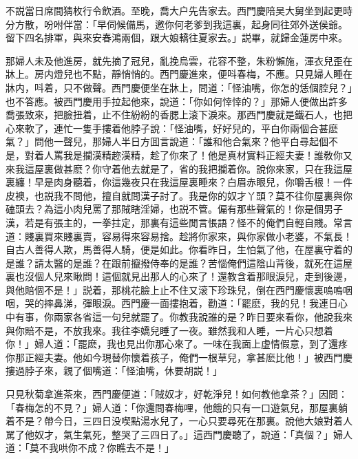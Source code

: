 不説當日席間猜枚行令飲酒。至晚，喬大户先告家去。西門慶陪吴大舅坐到起更時分方散，吩咐伴當：「早伺候備馬，邀你何老爹到我這裏，起身同往郊外送侯爺。留下四名排軍，與來安春鴻兩個，跟大娘轎往夏家去。」説畢，就歸金蓮房中來。

那婦人未及他進房，就先摘了冠兒，亂挽烏雲，花容不整，朱粉懶施，渾衣兒歪在牀上。房内燈兒也不點，靜悄悄的。西門慶進來，便呌春梅，不應。只見婦人睡在牀内，呌着，只不做聲。西門慶便坐在牀上，問道：「怪油嘴，你怎的恁個腔兒？」也不答應。被西門慶用手拉起他來，說道：「你如何悻悻的？」那婦人便做出許多喬張致來，把臉扭着，止不住紛紛的香腮上滚下淚來。那西門慶就是鐵石人，也把心來軟了，連忙一隻手摟着他脖子說：「怪油嘴，好好兒的，平白你兩個合甚麽氣？」問他一聲兒，那婦人半日方囬言說道：「誰和他合氣來？他平白尋起個不是，對着人罵我是攔漢精趂漢精，趁了你來了！他是真材實料正經夫妻！誰敎你又來我這屋裏做甚麽？你守着他去就是了，省的我把攔着你。說你來家，只在我這屋裏纏！早是肉身聽着，你這幾夜只在我這屋裏睡來？白眉赤眼兒，你嚼舌根！一件皮襖，也説我不問他，擅自就問漢子討了。我是你的奴才丫頭？莫不往你屋裏與你磕頭去？為這小肉兒罵了那賊瞎淫婦，也説不管。偏有那些聲氣的！你是個男子漢，若是有張主的，一拳拄定，那裏有這些閒言悵語？怪不的俺們自輕自賤。常言道：賤裏買來賤裏賣，容易得來容易捨。趁將你家來，與你家做小老婆，不氣長！自古人善得人欺，馬善得人騎，便是如此。你看昨日，生怕氣了他，在屋裏守着的是誰？請太醫的是誰？在跟前攛撥侍奉的是誰？苦惱俺們這陰山背後，就死在這屋裏也沒個人兒來瞅問！這個就見出那人的心來了！還教含着那眼淚兒，走到後邊，與他賠個不是！」説着，那桃花臉上止不住又滚下珍珠兒，倒在西門慶懷裏嗚嗚咽咽，哭的摔鼻涕，彈眼淚。西門慶一面摟抱着，勸道：「罷麽，我的兒！我連日心中有事，你兩家各省這一句兒就罷了。你教我說誰的是？昨日要來看你，他說我來與你賠不是，不放我來。我往李嬌兒睡了一夜。雖然我和人睡，一片心只想着你！」婦人道：「罷麽，我也見出你那心來了。一味在我面上虚情假意，到了還疼你那正經夫妻。他如今現替你懷着孩子，俺們一根草兒，拿甚麽比他！」被西門慶摟過脖子來，親了個嘴道：「怪油嘴，休要胡説！」

只見秋菊拿進茶來，西門慶便道：「賊奴才，好乾淨兒！如何教他拿茶？」因問：「春梅怎的不見？」婦人道：「你還問春梅哩，他餓的只有一口遊氣兒，那屋裏躺着不是？帶今日，三四日没喫點湯水兒了，一心只要尋死在那裏。說他大娘對着人駡了他奴才，氣生氣死，整哭了三四日了。」這西門慶聽了，說道：「真個？」婦人道：「莫不我哄你不成？你瞧去不是！」

